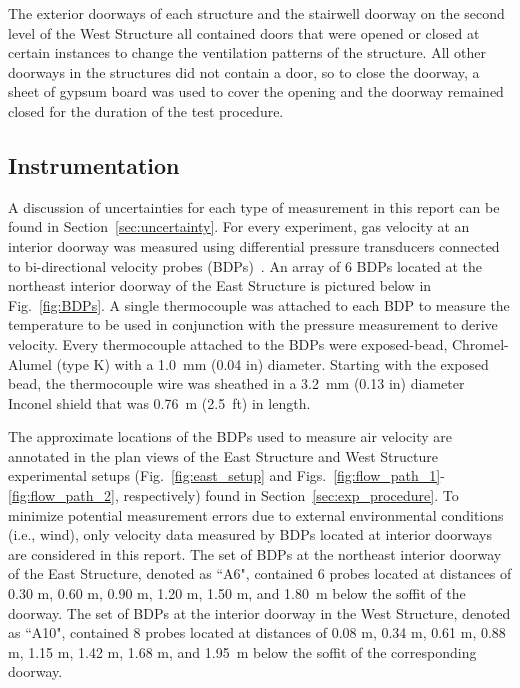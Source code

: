 \documentclass[12pt,oneside]{book}
\begin{document}
The exterior doorways of each structure and the stairwell doorway on the second level of the West Structure all contained doors that were opened or closed at certain instances to change the ventilation patterns of the structure. All other doorways in the structures did not contain a door, so to close the doorway, a sheet of gypsum board was used to cover the opening and the doorway remained closed for the duration of the test procedure.
\FloatBarrier

\subsection{Instrumentation}
\label{sec:instrumentation}
A discussion of uncertainties for each type of measurement in this report can be found in Section~\ref{sec:uncertainty}. For every experiment, gas velocity at an interior doorway was measured using differential pressure transducers connected to bi-directional velocity probes (BDPs)~\cite{McCaffrey:Combustion_and_Flame}. An array of 6 BDPs located at the northeast interior doorway of the East Structure is pictured below in Fig.~\ref{fig:BDPs}. A single thermocouple was attached to each BDP to measure the temperature to be used in conjunction with the pressure measurement to derive velocity. Every thermocouple attached to the BDPs were exposed-bead, Chromel-Alumel (type K) with a 1.0~mm (0.04 in) diameter. Starting with the exposed bead, the thermocouple wire was sheathed in a 3.2~mm (0.13 in) diameter Inconel shield that was 0.76~m (2.5~ft) in length. 

The approximate locations of the BDPs used to measure air velocity are annotated in the plan views of the East Structure and West Structure experimental setups (Fig.~\ref{fig:east_setup} and Figs.~\ref{fig:flow_path_1}-\ref{fig:flow_path_2}, respectively) found in Section~\ref{sec:exp_procedure}. To minimize potential measurement errors due to external environmental conditions (i.e., wind), only velocity data measured by BDPs located at interior doorways are considered in this report. The set of BDPs at the northeast interior doorway of the East Structure, denoted as ``A6", contained 6 probes located at distances of 0.30 m, 0.60 m, 0.90 m, 1.20 m, 1.50 m, and 1.80~m below the soffit of the doorway. The set of BDPs at the interior doorway in the West Structure, denoted as ``A10", contained 8 probes located at distances of 0.08 m, 0.34 m, 0.61 m, 0.88 m, 1.15 m, 1.42 m, 1.68 m, and 1.95~m below the soffit of the corresponding doorway.
\end{document}
